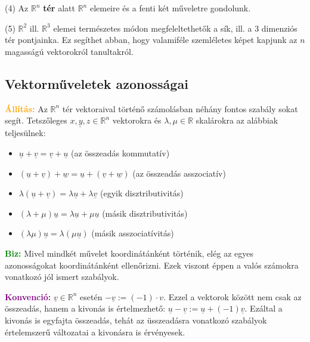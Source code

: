 \documentclass[../szamtud.tex]{subfiles}
\begin{document}
        (4) Az $\mathbb{R}^n$ \textbf{tér} alatt $\mathbb{R}^n$ elemeire és a fenti két műveletre gondolunk.

        (5) $\mathbb{R}^2$ ill. $\mathbb{R}^3$ elemei természetes módon megfeleltethetők a sík, ill. a 3 dimenziós tér pontjainka. Ez segíthet abban, hogy valamiféle szemléletes képet kapjunk az $n$ magasságú vektorokról tanultakról.

    \subsection{Vektorműveletek azonosságai}
    
        \textcolor{orange}{\textbf{Állítás:}} Az $\mathbb{R}^n$ tér vektoraival történő számolásban néhány fontos szabály sokat segít. Tetszőleges $\underline{x,y,z} \in \mathbb{R}^n$ vektorokra és $\lambda, \mu \in \mathbb{R}$ skalárokra az alábbiak teljesülnek:
        \begin{itemize}
            \item[(1)] $\underline{u} + \underline{v} = \underline{v} + \underline{u}$ (az összeadás kommutatív)
            \item[(2)] $(\underline{u}+\underline{v})+\underline{w} = \underline{u} + (\underline{v} + \underline{w})$ (az összeadás asszociatív) 
            \item[(3)] $\lambda(\underline{u}+\underline{v}) = \lambda\underline{u} + \lambda \underline{v}$ (egyik disztributivitás)
            \item[(4)] $(\lambda + \mu)\underline{u} = \lambda \underline{u} + \mu \underline{u}$ (másik disztributivitás)
            \item[(5)] $(\lambda\mu)\underline{u} = \lambda(\mu\underline{u})$ (másik asszociatívitás)
        \end{itemize}

        \textcolor{green}{\textbf{Biz:}} Mivel mindkét művelet koordinátánként történik, elég az egyes azonosságokat koordinátánként ellenőrizni. Ezek viszont éppen a valós számokra vonatkozó jól ismert szabályok. 

        \textcolor{purple}{\textbf{Konvenció:}} $\underline{v} \in \mathbb{R}^n$ esetén $-\underline{v} := (-1) \cdot v$.
        Ezzel a vektorok között nem csak az összeadás, hanem a kivonás is értelmezhető: $\underline{u} - \underline{v} := \underline{u} + (-1)\underline{v}$. Ezáltal a kivonás is egyfajta összeadás, tehát az üsszeadásra vonatkozó szabályok értelemszerű változatai a kivonásra is érvényesek.
\end{document}

